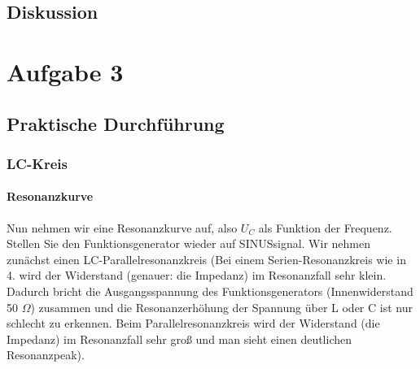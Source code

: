 \documentclass[12pt]{scrartcl}
\begin{document}
\subsection{Diskussion}
\section{Aufgabe 3}
\subsection{Praktische Durchführung}
\subsubsection{LC-Kreis}
\paragraph{Resonanzkurve} 
Nun nehmen wir eine Resonanzkurve auf, also $U_C$ als Funktion der Frequenz. Stellen Sie den Funktionsgenerator wieder auf SINUSsignal. Wir nehmen zunächst einen LC-Parallelresonanzkreis (Bei einem Serien-Resonanzkreis wie in 4. wird der Widerstand (genauer: die Impedanz) im Resonanzfall sehr klein. Dadurch bricht die Ausgangsspannung des Funktionsgenerators (Innenwiderstand 50
$\Omega$) zusammen und die Resonanzerhöhung der Spannung über L oder C ist
nur schlecht zu erkennen. Beim Parallelresonanzkreis wird der Widerstand (die Impedanz) im Resonanzfall sehr groß und man sieht einen deutlichen Resonanzpeak).
\end{document}
